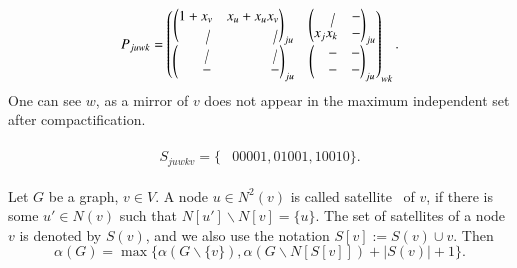 \documentclass[review,onefignum,onetabnum]{siamart190516}
\newcommand{\<}{\langle}
\renewcommand{\>}{\rangle}
\begin{document}
\begin{align}
    P_{juwk} = \left(\begin{matrix}
        \left(\begin{matrix}
        1+x_v & x_u+x_ux_v \\
        ~~~~~~~\cancel{} & ~~~~~~~~~~~~~\cancel{}\\
        \end{matrix}\right)_{ju}&
        \left(\begin{matrix}
        ~~~~\cancel{} & - \\
        x_jx_k & -
        \end{matrix}\right)_{ju}\\
        \left(\begin{matrix}
        ~~~~~~~\cancel{} & ~~~~~~~~~~~~~\cancel{} \\
        ~~~~~~~- & ~~~~~~~~~~~~~-
        \end{matrix}\right)_{ju} &
        \left(\begin{matrix}
        ~~~~- & - \\
        ~~~~- & -
        \end{matrix}\right)_{ju}
    \end{matrix}\right)_{wk}.
\end{align}
One can see $w$, as a mirror of $v$ does not appear in the maximum independent set after compactification.

\begin{align}
    \begin{split}
    S_{juwkv} = \{&00001, 01001, 10010\}.
    \end{split}
\end{align}

\begin{corollary} %
Let $G$ be a graph, $v \in V$. A node $u \in N^2(v)$ is called satellite~\cite{Kneis2009} of $v$, if there is some $u' \in N(v)$ such that $N[u'] \backslash N[v] = \{u\}$.
The set of satellites of a node $v$ is denoted by $S(v)$, and we also use the notation $S[v] := S(v) \cup {v}$. Then 
\begin{equation}
\alpha(G) = \max\{\alpha(G \backslash \{v\}), \alpha(G \backslash N[S[v]]) + |S(v)| + 1\}.
\end{equation}
\end{corollary}
\end{document}
